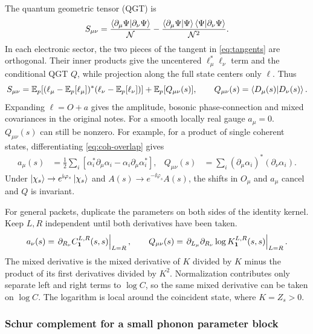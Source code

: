 \documentclass[../../main.tex]{subfiles}
\begin{document}
The quantum geometric tensor (QGT) is
\begin{equation}
 S_{\mu\nu}=
 \frac{\left\langle \partial_\mu\Psi \middle| \partial_\nu\Psi \right\rangle}{\mathcal N}
 -\frac{\left\langle \partial_\mu\Psi \middle| \Psi \right\rangle\left\langle \Psi \middle| \partial_\nu\Psi \right\rangle}
        {\mathcal N^2}.
 \label{eq:qgt-global}
\end{equation}
In each electronic sector, the two pieces of the tangent in
\cref{eq:tangents} are orthogonal. Their inner products give the
uncentered \(\ell_\mu^*\ell_\nu\) term and the conditional QGT \(Q\),
while projection along the full state centers only \(\ell\). Thus
\begin{equation}
 S_{\mu\nu}
   = \mathbb{E}_p[(\ell_\mu-\mathbb{E}_p[\ell_\mu])^*(\ell_\nu-\mathbb{E}_p[\ell_\nu])]
     +\mathbb{E}_p[Q_{\mu\nu}(s)],
 \qquad Q_{\mu\nu}(s)=\left\langle D_\mu(s) \middle| D_\nu(s) \right\rangle .
 \label{eq:qgt-decomp}
\end{equation}
Expanding \(\ell=O+a\) gives the amplitude, bosonic phase-connection and
mixed covariances in the original notes. For a smooth locally real gauge
\(a_\mu=0\). \(Q_{\mu\nu}(s)\) can still be nonzero. For example, for a
product of single coherent states, differentiating
\cref{eq:coh-overlap} gives
\begin{align}
 a_\mu(s)&=\tfrac12\sum_i
     \left[\alpha_i^*\partial_\mu\alpha_i
            -\alpha_i\partial_\mu\alpha_i^*\right], &
 Q_{\mu\nu}(s)&=\sum_i
     (\partial_\mu\alpha_i)^*(\partial_\nu\alpha_i).
 \label{eq:qgt-coherent}
\end{align}
Under \(\left\lvert \chi_s \right\rangle\to e^{\mathrm{i}\varphi_s}\left\lvert \chi_s \right\rangle\) and
\(A(s)\to e^{-\ii\varphi_s}A(s)\), the shifts in \(O_\mu\) and \(a_\mu\)
cancel and \(Q\) is invariant.

For general packets, duplicate the parameters on both sides of the
identity kernel. Keep \(L,R\) independent until both derivatives have
been taken.
\begin{equation}
 a_\nu(s)=
   \left.\partial_{R_\nu} C_{\mathbf{1}}^{L,R}(s,s)\right|_{L=R},\qquad
 Q_{\mu\nu}(s)=
   \left.\partial_{L_\mu}\partial_{R_\nu}
        \log K_{\mathbf{1}}^{L,R}(s,s)\right|_{L=R}.
 \label{eq:qgt-kernel}
\end{equation}
The mixed derivative is the mixed derivative of \(K\) divided by \(K\)
minus the product of its first derivatives divided by \(K^2\).
Normalization contributes only separate left and right terms to
\(\log C\), so the same mixed derivative can be taken on \(\log C\).
The logarithm is local around the coincident state, where \(K=Z_s>0\).

\subsubsection{Schur complement for a small phonon parameter block}
\label{sec:sr}
\end{document}

